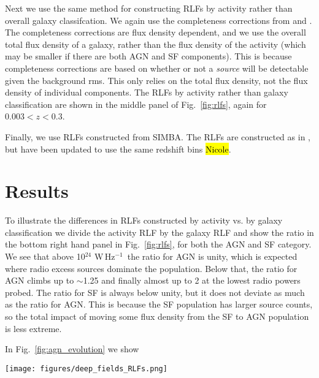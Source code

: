\documentclass[usenatbib,fleqn,letters]{mnras}
\newcommand{\wphz}{$\,$W$\,$Hz$^{-1}$}
\begin{document}
Next we use the same method for constructing RLFs by activity rather than overall galaxy classifcation. We again use the completeness corrections from \cite{cochrane_lofar_2023} and \cite{kondapally_cosmic_2022}. The completeness corrections are flux density dependent, and we use the overall total flux density of a galaxy, rather than the flux density of the activity (which may be smaller if there are both AGN and SF components). This is because completeness corrections are based on whether or not a \textit{source} will be detectable given the background rms. This only relies on the total flux density, not the flux density of individual components. The RLFs by activity rather than galaxy classification are shown in the middle panel of Fig.~\ref{fig:rlfs}, again for  $0.003 < z < 0.3$. 

Finally, we use RLFs constructed from SIMBA. The RLFs are constructed as in \cite{thomson_radio_2019}, but have been updated to use the same redshift bins \hl{Nicole}. 

\section{Results}

To illustrate the differences in RLFs constructed by activity vs. by galaxy classification we divide the activity RLF by the galaxy RLF and show the ratio in the bottom right hand panel in Fig.~\ref{fig:rlfs}, for both the AGN and SF category. We see that above 10$^{24}\,$\wphz\ the ratio for AGN is unity, which is expected where radio excess sources dominate the population. Below that, the ratio for AGN climbs up to $\sim$1.25 and finally almost up to 2 at the lowest radio powers probed. The ratio for SF is always below unity, but it does not deviate as much as the ratio for AGN. This is because the SF population has larger source counts, so the total impact of moving some flux density from the SF to AGN population is less extreme. 

In Fig.~\ref{fig:agn_evolution} we show 





\begin{figure*}
    \centering
    \texttt{[image: figures/deep\_fields\_RLFs.png]}
    \caption{Caption}
    \label{fig:rlfs}
\end{figure*}
\end{document}
